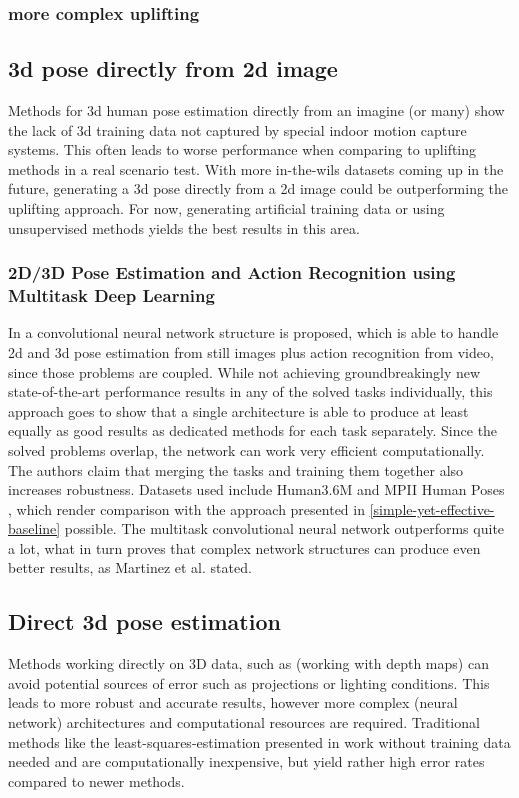 \subsubsection{more complex uplifting}
 
\subsection{3d pose directly from 2d image}
Methods for 3d human pose estimation directly from an imagine (or many) show the lack of 3d training data not captured by special indoor motion capture systems. This often leads to worse performance when comparing to uplifting methods in a real scenario test. With more in-the-wils datasets coming up in the future, generating a 3d pose directly from a 2d image could be outperforming the uplifting approach. For now, generating artificial training data or using unsupervised methods yields the best results in this area.
\subsubsection{2D/3D Pose Estimation and Action Recognition using Multitask Deep Learning}
In \cite{Luvizon2018} a convolutional neural network structure is proposed, which is able to handle 2d and 3d pose estimation from still images plus action recognition from video, since those problems are coupled. While not achieving groundbreakingly new state-of-the-art performance results in any of the solved tasks individually, this approach goes to show that a single architecture is able to produce at least equally as good results as dedicated methods for each task separately. Since the solved problems overlap, the network can work very efficient computationally. The authors claim that merging the tasks and training them together also increases robustness. Datasets used include Human3.6M \cite{H3.6M} and MPII Human Poses \cite{andriluka14cvpr}, which render comparison with the approach presented in \autoref{simple-yet-effective-baseline} possible. The multitask convolutional neural network outperforms \cite{Martinez_2017_ICCV} quite a lot, what in turn proves that complex network structures can produce even better results, as Martinez et al. stated.


\subsection{Direct 3d pose estimation}
Methods working directly on 3D data, such as \cite{Ye2011} (working with depth maps) can avoid potential sources of error such as projections or lighting conditions. This leads to more robust and accurate results, however more complex (neural network) architectures and computational resources are required. Traditional methods like the least-squares-estimation presented in \cite{Haralick98} work without training data needed and are computationally inexpensive, but yield rather high error rates compared to newer methods.

